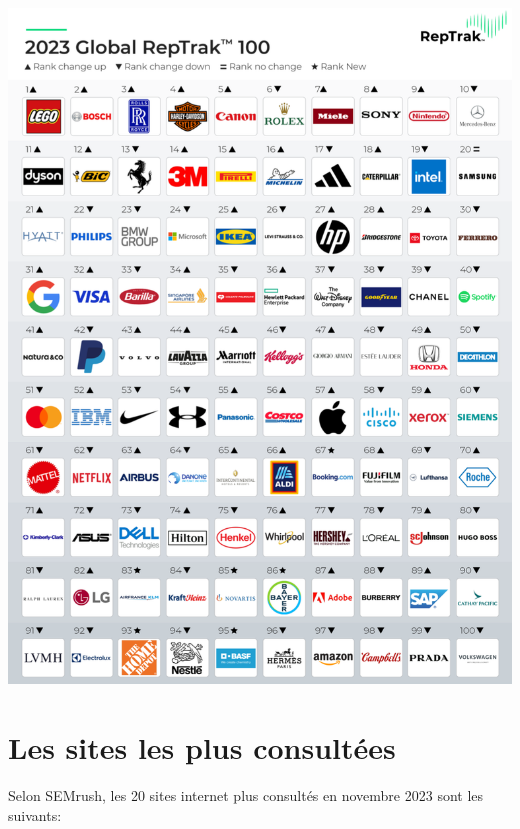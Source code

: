 \documentclass[12pt, a4paper]{report}
\begin{document}
\begin{center}
    \includegraphics[scale=.85]{assets/images/reptrak-top-100.png}
\end{center}

\section{Les sites les plus consultées}

Selon SEMrush, les 20 sites internet plus consultés en novembre 2023 sont les suivants:
\end{document}
